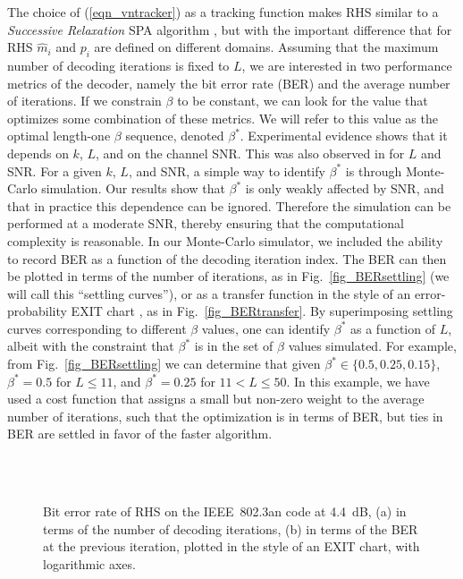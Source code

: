 \documentclass[12pt,journal,twoside,draftcls,onecolumn]{IEEEtran}
\begin{document}
The choice of (\ref{eqn_vntracker}) as a tracking function makes RHS similar to a \emph{Successive Relaxation} SPA algorithm \cite{hemati:2006a}, but with the important difference that for RHS $\hat{m}_i$ and $p_i$ are defined on different domains.
Assuming that the maximum number of decoding iterations is fixed to $L$, we are interested in two performance metrics of the decoder, namely the bit error rate (BER) and the average number of iterations.
If we constrain $\beta$ to be constant, we can look for the value that optimizes some combination of these metrics. We will refer to this value as the optimal length-one $\beta$ sequence, denoted $\beta^{*}$. Experimental evidence shows that it depends on $k$, $L$, and on the channel SNR. This was also observed in \cite{hemati:2006a} for $L$ and SNR.
For a given $k$, $L$, and SNR, a simple way to identify $\beta^{*}$ is through Monte-Carlo simulation. Our results show that $\beta^{*}$ is only weakly affected by SNR, and that in practice this dependence can be ignored. Therefore the simulation can be performed at a moderate SNR, thereby ensuring that the computational complexity is reasonable. 
In our Monte-Carlo simulator, we included the ability to record BER as a function of the decoding iteration index. The BER can then be plotted in terms of the number of iterations, as in Fig.~\ref{fig_BERsettling} (we will call this ``settling curves''), or as a transfer function in the style of an error-probability EXIT chart \cite{ardakani:2004}, as in Fig.~\ref{fig_BERtransfer}.
By superimposing settling curves corresponding to different $\beta$ values, one can identify $\beta^{*}$ as a function of $L$, albeit with the constraint that $\beta^{*}$ is in the set of $\beta$ values simulated. 
For example, from Fig.~\ref{fig_BERsettling} we can determine that given $\beta^{*} \in \{0.5, 0.25, 0.15\}$, $\beta^{*} = 0.5$ for $L \leq 11$, and $\beta^{*} = 0.25$ for $11 < L \leq 50$. In this example, we have used a cost function that assigns a small but non-zero weight to the average number of iterations, such that the optimization is in terms of BER, but ties in BER are settled in favor of the faster algorithm.


	\begin{figure}[tbp]
	\begin{center}
\ifCLASSOPTIONdraftcls
	 \\
\else
	 \\
\fi
	\caption{Bit error rate of RHS on the IEEE~802.3an code \cite{djurdjevic:2003} at 4.4~dB, (a) in terms of the number of decoding iterations, (b) in terms of the BER at the previous iteration, plotted in the style of an EXIT chart, with logarithmic axes.} 
	\end{center}
	\end{figure}
\end{document}
